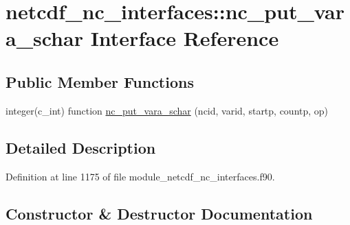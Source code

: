 \hypertarget{interfacenetcdf__nc__interfaces_1_1nc__put__vara__schar}{}\section{netcdf\+\_\+nc\+\_\+interfaces\+:\+:nc\+\_\+put\+\_\+vara\+\_\+schar Interface Reference}
\label{interfacenetcdf__nc__interfaces_1_1nc__put__vara__schar}
\subsection*{Public Member Functions}
\begin{DoxyCompactItemize}
\item 
integer(c\+\_\+int) function \hyperlink{interfacenetcdf__nc__interfaces_1_1nc__put__vara__schar_a1c052cf7491e3fd433fb79e1d14216a3}{nc\+\_\+put\+\_\+vara\+\_\+schar} (ncid, varid, startp, countp, op)
\end{DoxyCompactItemize}


\subsection{Detailed Description}


Definition at line 1175 of file module\+\_\+netcdf\+\_\+nc\+\_\+interfaces.\+f90.



\subsection{Constructor \& Destructor Documentation}
\mbox{\label{interfacenetcdf__nc__interfaces_1_1nc__put__vara__schar_a1c052cf7491e3fd433fb79e1d14216a3}} 
